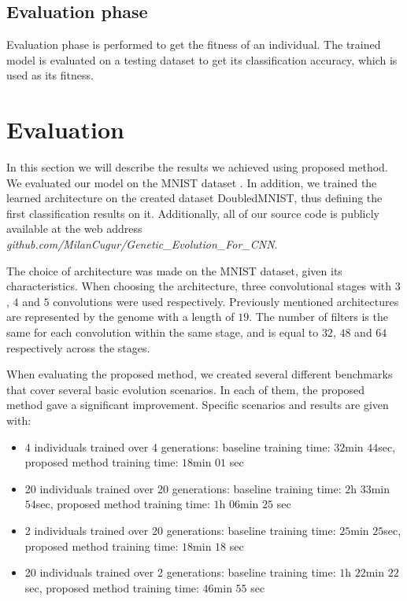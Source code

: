 \documentclass[eng]{simposium}
\begin{document}
\subsection{Evaluation phase}
Evaluation phase is performed to get the fitness of an individual.
The trained model is evaluated on a testing dataset to get its classification accuracy, which is used as its fitness.

\section{Evaluation}

In this section we will describe the results we achieved using proposed method. 
We evaluated our model on the MNIST dataset \cite{8}. In addition, we trained the learned architecture on the 
created dataset DoubledMNIST, thus defining the first classification results on it. 
Additionally, all of our source code is publicly available at the web address \textit{github.com/MilanCugur/Genetic\_Evolution\_For\_CNN}. 

The choice of architecture was made on the MNIST dataset, given its characteristics. 
When choosing the architecture, three convolutional stages with $3$, $4$ and $5$ convolutions were used respectively. 
Previously mentioned architectures are represented by the genome with a length of $19$.
The number of filters is the same for each convolution within the same stage, and is equal to $32$, $48$ and $64$ respectively across the stages. 

When evaluating the proposed method, we created several different benchmarks that cover several basic evolution scenarios. 
In each of them, the proposed method gave a significant improvement. 
Specific scenarios and results are given with:
\begin{itemize}
  \item 4 individuals trained over 4 generations: baseline training time: $32$min $44$sec, proposed method training time: $18$min $01$ sec
  \item 20 individuals trained over 20 generations: baseline training time: $2$h $33$min $54$sec, proposed method training time: $1$h $06$min $25$ sec
  \item 2 individuals trained over 20 generations: baseline training time: $25$min $25$sec, proposed method training time: $18$min $18$ sec
  \item 20 individuals trained over 2 generations: baseline training time: $1$h $22$min $22$sec, proposed method training time: $46$min $55$ sec
\end{itemize}
\end{document}
